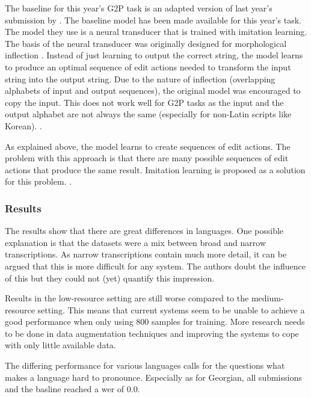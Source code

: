 The baseline for this year's G2P task is an adapted version of last year's submission by \citet{makarov-clematide-2020-cluzh}. The baseline model has been made available for this year's task. The model they use is a neural transducer that is trained with imitation learning. The basis of the neural transducer was originally designed for morphological inflection \citep{Aharoni&Goldberg.2016}. Instead of just learning to output the correct string, the model learns to produce an optimal sequence of edit actions needed to transform the input string into the output string. Due to the nature of inflection (overlapping alphabets of input and output sequences), the original model was encouraged to copy the input. This does not work well for G2P tasks as the input and the output alphabet are not always the same (especially for non-Latin scripts like Korean). . 

As explained above, the model learns to create sequences of edit actions. The problem with this approach is that there are many possible sequences of edit actions that produce the same result. Imitation learning is proposed as a solution for this problem. . 

\subsubsection*{Results}
The results show that there are great differences in languages. One possible explanation is that the datasets were a mix between broad and narrow transcriptions. As narrow transcriptions contain much more detail, it can be argued that this is more difficult for any system. The authors doubt the influence of this but they could not (yet) quantify this impression. 

Results in the low-resource setting are still worse compared to the medium-resource setting. This means that current systems seem to be unable to achieve a good performance when only using 800 samples for training. More research needs to be done in data augmentation techniques and improving the systems to cope with only little available data.

The differing performance for various languages calls for the questions what makes a language hard to pronounce. Especially as for Georgian, all submissions and the basline reached a \ac{wer} of $0.0$.

  
